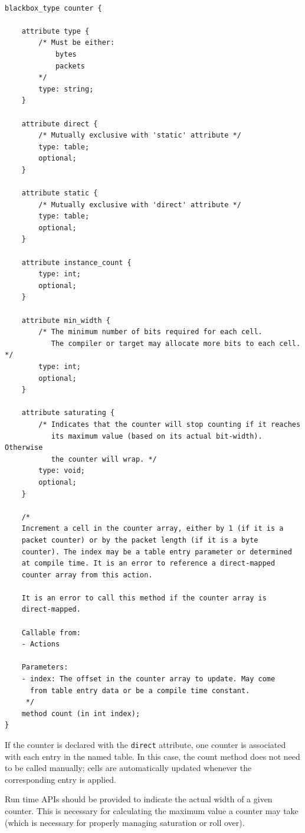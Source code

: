 \documentclass[12pt]{article}
\begin{document}
\begin{lstlisting}[style=P4style]

blackbox_type counter {
        
    attribute type {
        /* Must be either:
            bytes
            packets
        */
        type: string;
    }

    attribute direct {
        /* Mutually exclusive with 'static' attribute */
        type: table;
        optional;
    }

    attribute static {
        /* Mutually exclusive with 'direct' attribute */
        type: table;
        optional;
    }

    attribute instance_count {
        type: int;
        optional;
    }

    attribute min_width {
        /* The minimum number of bits required for each cell. 
           The compiler or target may allocate more bits to each cell. */
        type: int;
        optional;
    }

    attribute saturating {
        /* Indicates that the counter will stop counting if it reaches
           its maximum value (based on its actual bit-width). Otherwise
           the counter will wrap. */
        type: void;
        optional;
    }

    /*
    Increment a cell in the counter array, either by 1 (if it is a
    packet counter) or by the packet length (if it is a byte
    counter). The index may be a table entry parameter or determined
    at compile time. It is an error to reference a direct-mapped
    counter array from this action.
    
    It is an error to call this method if the counter array is
    direct-mapped.

    Callable from:
    - Actions

    Parameters:
    - index: The offset in the counter array to update. May come
      from table entry data or be a compile time constant.
     */
    method count (in int index);
}

\end{lstlisting}

If the counter is declared with the \texttt{direct} attribute, one
counter is associated with each entry in the named table. In this
case, the count method does not need to be called manually; cells
are automatically updated whenever the corresponding entry is
applied. 

Run time APIs should be provided to indicate the actual width of a
given counter.  This is necessary for calculating the maximum value a
counter may take (which is necessary for properly managing saturation
or roll over).
\end{document}
